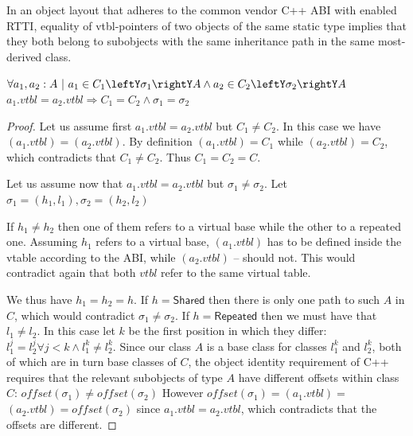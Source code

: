 \begin{theorem}
In an object layout that adheres to the common vendor C++ ABI with enabled RTTI, 
equality of vtbl-pointers of two objects of the same static type implies that 
they both belong to subobjects with the same inheritance path in the same most-derived class.

\noindent
$\forall a_1, a_2 : A\ |\ a_1\in C_1\leftY\sigma_1\rightY A \wedge a_2\in C_2\leftY\sigma_2\rightY A $ \\ 
$a_1.\textit{vtbl} = a_2.\textit{vtbl} \Rightarrow C_1 = C_2 \wedge \sigma_1 = \sigma_2$
\label{thm:vtbl}
\end{theorem}
\begin{proof}
Let us assume first $a_1.\textit{vtbl} = a_2.\textit{vtbl}$ but $C_1 \neq C_2$. In this case we 
have $(a_1.\textit{vtbl}) = $$(a_2.\textit{vtbl})$. By definition 
$(a_1.\textit{vtbl}) = C_1$ while $(a_2.\textit{vtbl}) = C_2$, which 
contradicts that $C_1 \neq C_2$. Thus $C_1 = C_2 = C$.

Let us assume now that $a_1.\textit{vtbl} = a_2.\textit{vtbl}$ but $\sigma_1 \neq \sigma_2$. 
Let $\sigma_1=(h_1,l_1),\sigma_2=(h_2,l_2)$ 

If $h_1 \neq h_2$ then one of them refers to a virtual base while the other to a 
repeated one. Assuming $h_1$ refers to a virtual base, $(a_1.\textit{vtbl})$ 
has to be defined inside the vtable according to the ABI, while 
$(a_2.\textit{vtbl})$ -- should not. This would contradict again that both 
$vtbl$ refer to the same virtual table.

We thus have $h_1 = h_2 = h$. If $h = \mathsf{Shared}$ then there is only one path to 
such $A$ in $C$, which would contradict $\sigma_1 \neq \sigma_2$. 
If $h = \mathsf{Repeated}$ then we must have that $l_1 \neq l_2$. In this case let $k$ be 
the first position in which they differ: 
$l_1^j=l_2^j \forall j<k \wedge l_1^k\neq l_2^k$. Since our class $A$ is a base 
class for classes $l_1^k$ and $l_2^k$, both of which are in turn base classes of 
$C$, the object identity requirement of C++ requires that the relevant subobjects 
of type $A$ have different offsets within class $C$: 
$\mathit{offset}(\sigma_1)\neq \mathit{offset}(\sigma_2)$ However 
$\mathit{offset}(\sigma_1)=$$(a_1.\textit{vtbl})=$$(a_2.\textit{vtbl})=\mathit{offset}(\sigma_2)$ 
since $a_1.\textit{vtbl} = a_2.\textit{vtbl}$, which contradicts that the offsets are different.
\end{proof}

